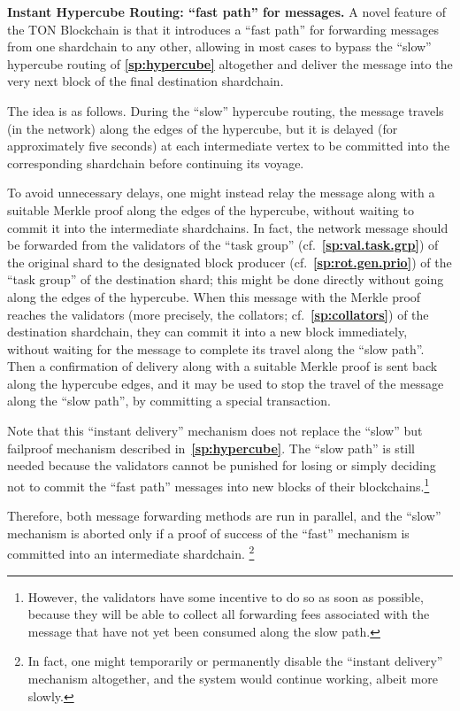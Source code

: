 \documentclass[12pt,oneside]{article}
\def\makepoint#1{\medbreak\noindent{\bf #1.\ }}
\def\nxsubpoint{\refstepcounter{subsubsection}%
  \smallbreak\makepoint{\thesubsubsection}}
\def\refpoint#1{{\rm\textbf{\ref{#1}}}}
\let\ptref=\refpoint
\def\embt(#1.){\textbf{#1.}}
\begin{document}
\nxsubpoint\label{sp:instant.hypercube} \embt(Instant Hypercube
Routing: ``fast path'' for messages.)  A novel feature of the TON
Blockchain is that it introduces a ``fast path'' for forwarding
messages from one shardchain to any other, allowing in most cases to
bypass the ``slow'' hypercube routing of \ptref{sp:hypercube}
altogether and deliver the message into the very next block of the
final destination shardchain.

The idea is as follows. During the ``slow'' hypercube routing, the
message travels (in the network) along the edges of the hypercube, but
it is delayed (for approximately five seconds) at each intermediate
vertex to be committed into the corresponding shardchain before
continuing its voyage.

To avoid unnecessary delays, one might instead relay the message along
with a suitable Merkle proof along the edges of the hypercube, without
waiting to commit it into the intermediate shardchains. In fact, the
network message should be forwarded from the validators of the ``task
group'' (cf.~\ptref{sp:val.task.grp}) of the original shard to the
designated block producer (cf.~\ptref{sp:rot.gen.prio}) of the ``task
group'' of the destination shard; this might be done directly without
going along the edges of the hypercube. When this message with the
Merkle proof reaches the validators (more precisely, the collators;
cf.~\ptref{sp:collators}) of the destination shardchain, they can
commit it into a new block immediately, without waiting for the
message to complete its travel along the ``slow path''. Then a
confirmation of delivery along with a suitable Merkle proof is sent
back along the hypercube edges, and it may be used to stop the travel
of the message along the ``slow path'', by committing a special
transaction.

Note that this ``instant delivery'' mechanism does not replace the
``slow'' but failproof mechanism described
in~\ptref{sp:hypercube}. The ``slow path'' is still needed because the
validators cannot be punished for losing or simply deciding not to
commit the ``fast path'' messages into new blocks of their
blockchains.\footnote{However, the validators have some incentive to do
  so as soon as possible, because they will be able to collect all
  forwarding fees associated with the message that have not yet been
  consumed along the slow path.}

Therefore, both message forwarding methods are run in parallel, and
the ``slow'' mechanism is aborted only if a proof of success of the
``fast'' mechanism is committed into an intermediate shardchain.%
\footnote{In fact, one might temporarily or permanently disable the
  ``instant delivery'' mechanism altogether, and the system would
  continue working, albeit more slowly.}
\end{document}
